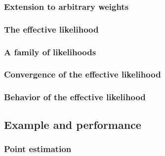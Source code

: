 \subsubsection{Extension to arbitrary weights\label{sec:extending}}
\begingroup
\graphicspath{{results/mcllh_paper/}}

\endgroup

\subsubsection{The effective likelihood\label{sec:effective}}
\begingroup
\graphicspath{{results/mcllh_paper/}}

\endgroup

\subsubsection{A family of likelihoods\label{sec:priors}}
\begingroup
\graphicspath{{results/mcllh_paper/}}

\endgroup

\subsubsection{Convergence of the effective likelihood\label{sec:llhconvergence}}
\begingroup
\graphicspath{{results/mcllh_paper/}}

\endgroup

\subsubsection{Behavior of the effective likelihood\label{sec:llhbehavior}}
\begingroup
\graphicspath{{results/mcllh_paper/}}

\endgroup

\subsection{Example and performance\label{sec:example}}
\begingroup
\graphicspath{{results/mcllh_paper/}}

\endgroup

\subsubsection{Point estimation\label{sec:pointestimation}}
\begingroup
\graphicspath{{results/mcllh_paper/}}

\endgroup

